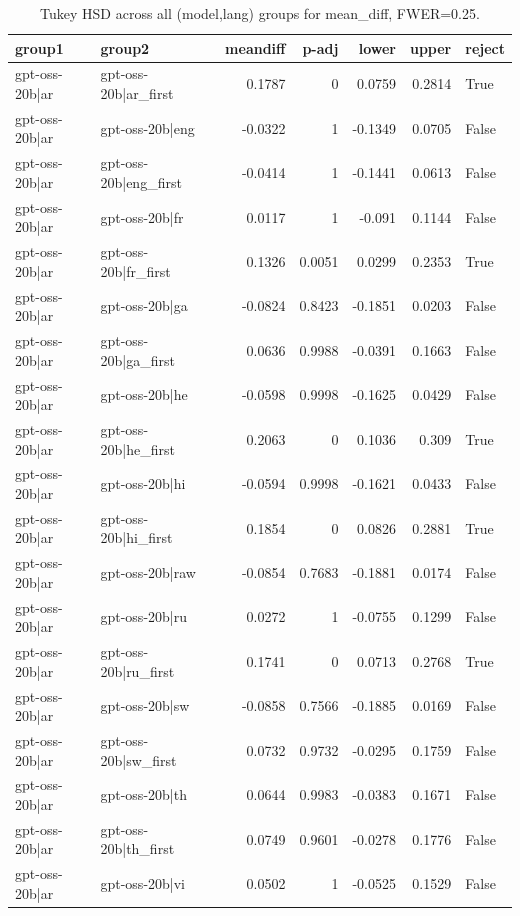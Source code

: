 \begin{table}
\caption{Tukey HSD across all (model,lang) groups for mean_diff, FWER=0.25.}
\label{tab:tukey_all_models_all_langs_mean_diff}
\begin{tabular}{l l r r r r l}
\toprule
group1 & group2 & meandiff & p-adj & lower & upper & reject \\
\midrule
gpt-oss-20b|ar & gpt-oss-20b|ar_first & 0.1787 & 0 & 0.0759 & 0.2814 & True \\
gpt-oss-20b|ar & gpt-oss-20b|eng & -0.0322 & 1 & -0.1349 & 0.0705 & False \\
gpt-oss-20b|ar & gpt-oss-20b|eng_first & -0.0414 & 1 & -0.1441 & 0.0613 & False \\
gpt-oss-20b|ar & gpt-oss-20b|fr & 0.0117 & 1 & -0.091 & 0.1144 & False \\
gpt-oss-20b|ar & gpt-oss-20b|fr_first & 0.1326 & 0.0051 & 0.0299 & 0.2353 & True \\
gpt-oss-20b|ar & gpt-oss-20b|ga & -0.0824 & 0.8423 & -0.1851 & 0.0203 & False \\
gpt-oss-20b|ar & gpt-oss-20b|ga_first & 0.0636 & 0.9988 & -0.0391 & 0.1663 & False \\
gpt-oss-20b|ar & gpt-oss-20b|he & -0.0598 & 0.9998 & -0.1625 & 0.0429 & False \\
gpt-oss-20b|ar & gpt-oss-20b|he_first & 0.2063 & 0 & 0.1036 & 0.309 & True \\
gpt-oss-20b|ar & gpt-oss-20b|hi & -0.0594 & 0.9998 & -0.1621 & 0.0433 & False \\
gpt-oss-20b|ar & gpt-oss-20b|hi_first & 0.1854 & 0 & 0.0826 & 0.2881 & True \\
gpt-oss-20b|ar & gpt-oss-20b|raw & -0.0854 & 0.7683 & -0.1881 & 0.0174 & False \\
gpt-oss-20b|ar & gpt-oss-20b|ru & 0.0272 & 1 & -0.0755 & 0.1299 & False \\
gpt-oss-20b|ar & gpt-oss-20b|ru_first & 0.1741 & 0 & 0.0713 & 0.2768 & True \\
gpt-oss-20b|ar & gpt-oss-20b|sw & -0.0858 & 0.7566 & -0.1885 & 0.0169 & False \\
gpt-oss-20b|ar & gpt-oss-20b|sw_first & 0.0732 & 0.9732 & -0.0295 & 0.1759 & False \\
gpt-oss-20b|ar & gpt-oss-20b|th & 0.0644 & 0.9983 & -0.0383 & 0.1671 & False \\
gpt-oss-20b|ar & gpt-oss-20b|th_first & 0.0749 & 0.9601 & -0.0278 & 0.1776 & False \\
gpt-oss-20b|ar & gpt-oss-20b|vi & 0.0502 & 1 & -0.0525 & 0.1529 & False \\

\end{tabular}
\end{table}
